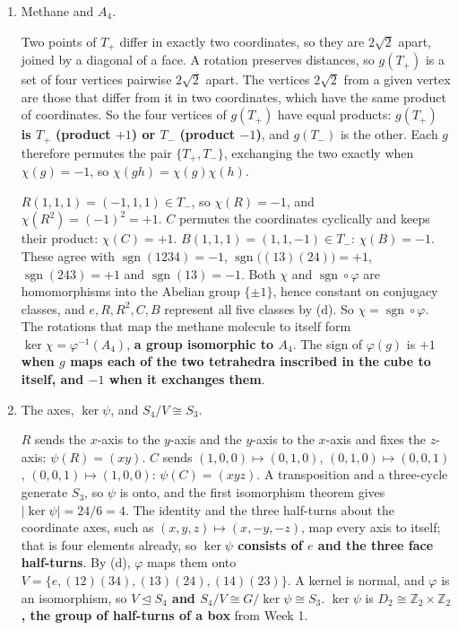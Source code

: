 \documentclass[11pt,a4paper]{article}
\newcommand{\Z}{\mathbb{Z}}
\DeclareMathOperator{\sgn}{sgn}
\newenvironment{parts}{\begin{enumerate}[label=\textbf{(\alph*)},leftmargin=2.2em,itemsep=0.6em,topsep=0.2em]}{\end{enumerate}}
\newcommand{\pq}[1]{\item {\color{black!60}#1}\par}
\newcommand{\ans}[1]{{\boldmath\bfseries #1}}
\begin{document}
\begin{parts}
For $g\colon (x, y, z) \mapsto (x, -y, -z)$, the half-turn about the $x$-axis, $g^{-1} = g$ and $g^{-1} R g\,(x, y, z) = g\,R(x, -y, -z) = g(y, x, -z) = (y, -x, z) = R^{-1}(x, y, z)$. So \ans{$g^{-1} R g = R^{-1}$}. Physically, $g$ turns the $z$-axis upside down, and a counterclockwise quarter-turn seen from the other end of its axis is clockwise: \ans{the turns by $+90^\circ$ and $-90^\circ$ are the same operation viewed from opposite ends}.

\pq{Methane and $A_4$.}
Two points of $T_+$ differ in exactly two coordinates, so they are $2\sqrt2$ apart, joined by a diagonal of a face. A rotation preserves distances, so $g(T_+)$ is a set of four vertices pairwise $2\sqrt2$ apart. The vertices $2\sqrt2$ from a given vertex are those that differ from it in two coordinates, which have the same product of coordinates. So the four vertices of $g(T_+)$ have equal products: \ans{$g(T_+)$ is $T_+$ (product $+1$) or $T_-$ (product $-1$)}, and $g(T_-)$ is the other. Each $g$ therefore permutes the pair $\{T_+, T_-\}$, exchanging the two exactly when $\chi(g) = -1$, so $\chi(gh) = \chi(g)\chi(h)$.

$R(1, 1, 1) = (-1, 1, 1) \in T_-$, so \ans{$\chi(R) = -1$}, and \ans{$\chi(R^2) = (-1)^2 = +1$}. $C$ permutes the coordinates cyclically and keeps their product: \ans{$\chi(C) = +1$}. $B(1, 1, 1) = (1, 1, -1) \in T_-$: \ans{$\chi(B) = -1$}. These agree with $\sgn(1234) = -1$, $\sgn\bigl((13)(24)\bigr) = +1$, $\sgn(243) = +1$ and $\sgn(13) = -1$. Both $\chi$ and $\sgn \circ \varphi$ are homomorphisms into the Abelian group $\{\pm 1\}$, hence constant on conjugacy classes, and $e, R, R^2, C, B$ represent all five classes by (d). So \ans{$\chi = \sgn \circ \varphi$}. The rotations that map the methane molecule to itself form $\ker\chi = \varphi^{-1}(A_4)$, \ans{a group isomorphic to $A_4$}. The sign of $\varphi(g)$ is \ans{$+1$ when $g$ maps each of the two tetrahedra inscribed in the cube to itself, and $-1$ when it exchanges them}.

\pq{The axes, $\ker\psi$, and $S_4/V \cong S_3$.}
$R$ sends the $x$-axis to the $y$-axis and the $y$-axis to the $x$-axis and fixes the $z$-axis: \ans{$\psi(R) = (xy)$}. $C$ sends $(1, 0, 0) \mapsto (0, 1, 0)$, $(0, 1, 0) \mapsto (0, 0, 1)$, $(0, 0, 1) \mapsto (1, 0, 0)$: \ans{$\psi(C) = (xyz)$}. A transposition and a three-cycle generate $S_3$, so $\psi$ is onto, and the first isomorphism theorem gives \ans{$|\ker\psi| = 24/6 = 4$}. The identity and the three half-turns about the coordinate axes, such as $(x, y, z) \mapsto (x, -y, -z)$, map every axis to itself; that is four elements already, so \ans{$\ker\psi$ consists of $e$ and the three face half-turns}. By (d), $\varphi$ maps them onto $V = \{e, (12)(34), (13)(24), (14)(23)\}$. A kernel is normal, and $\varphi$ is an isomorphism, so \ans{$V \trianglelefteq S_4$ and $S_4/V \cong G/\ker\psi \cong S_3$}. $\ker\psi$ is \ans{$D_2 \cong \Z_2 \times \Z_2$, the group of half-turns of a box} from Week 1.
\end{parts}
\end{document}
